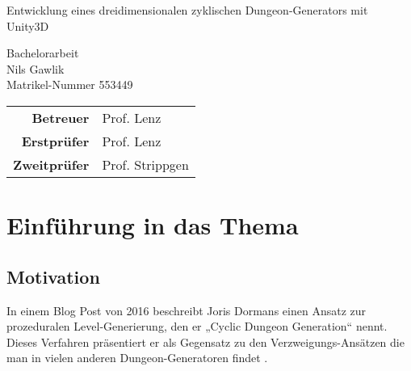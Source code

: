 
\pagestyle{empty} %

\clearscrheadings\clearscrplain
\begin{center}
\begin{Huge}
Entwicklung eines dreidimensionalen zyklischen Dungeon-Generators mit Unity3D\\
\end{Huge}
\vspace{8mm}
Bachelorarbeit\\
\vspace{0.4cm}
\vspace{2 cm}
Nils Gawlik \\
Matrikel-Nummer 553449\\
\vspace{8cm}
\begin{tabular}{rl}
{\bfseries Betreuer} & Prof. Lenz \\
{\bfseries Erstprüfer}& Prof. Lenz\\
{\bfseries Zweitprüfer}& Prof. Strippgen\\
\end{tabular}

\end{center}
\clearpage


\pagestyle{useheadings} %

\tableofcontents %
\listoffigures %
\clearpage

\chapter{Einführung in das Thema}

\section{Motivation}

In einem Blog Post von 2016 beschreibt Joris Dormans einen Ansatz zur prozeduralen Level-Generierung, den er „Cyclic Dungeon Generation“ nennt. Dieses Verfahren präsentiert er als Gegensatz zu den Verzweigungs-Ansätzen die man in vielen anderen Dungeon-Generatoren findet \cite{blogCyclic}.

